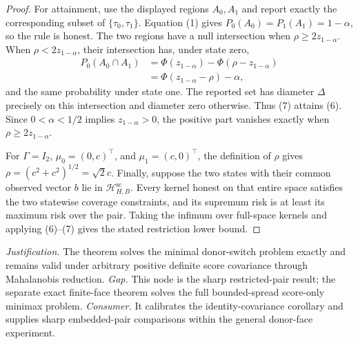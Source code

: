 \documentclass{article}
\begin{document}
\begin{proof}
For attainment, use the displayed regions \(A_0,A_1\) and report exactly the corresponding subset of \(\{\tau_0,\tau_1\}\). Equation (1) gives \(P_0(A_0)=P_1(A_1)=1-\alpha\), so the rule is honest. The two regions have a null intersection when \(\rho\geq2z_{1-\alpha}\). When \(\rho<2z_{1-\alpha}\), their intersection has, under state zero,
\[
\begin{aligned}
 P_0(A_0\cap A_1)
 &=\Phi(z_{1-\alpha})-\Phi(\rho-z_{1-\alpha})\\
 &=\Phi(z_{1-\alpha}-\rho)-\alpha,
\end{aligned}
 \tag{7}
\]
and the same probability under state one. The reported set has diameter \(\Delta\) precisely on this intersection and diameter zero otherwise. Thus (7) attains (6). Since \(0<\alpha<1/2\) implies \(z_{1-\alpha}>0\), the positive part vanishes exactly when \(\rho\geq2z_{1-\alpha}\).

For \(\Gamma=I_2\), \(\mu_0=(0,c)^{\top}\), and \(\mu_1=(c,0)^{\top}\), the definition of \(\rho\) gives \(\rho=(c^2+c^2)^{1/2}=\sqrt{2}c\). Finally, suppose the two states with their common observed vector \(b\) lie in \(\mathcal H_{H,B}^{\mathrm{sc}}\). Every kernel honest on that entire space satisfies the two statewise coverage constraints, and its supremum risk is at least its maximum risk over the pair. Taking the infimum over full-space kernels and applying (6)--(7) gives the stated restriction lower bound.
\end{proof}
\par\smallskip\noindent \textit{Justification.} The theorem solves the minimal donor-switch problem exactly and remains valid under arbitrary positive definite score covariance through Mahalanobis reduction. \textit{Gap.} This node is the sharp restricted-pair result; the separate exact finite-face theorem solves the full bounded-spread score-only minimax problem. \textit{Consumer.} It calibrates the identity-covariance corollary and supplies sharp embedded-pair comparisons within the general donor-face experiment.
\end{document}
